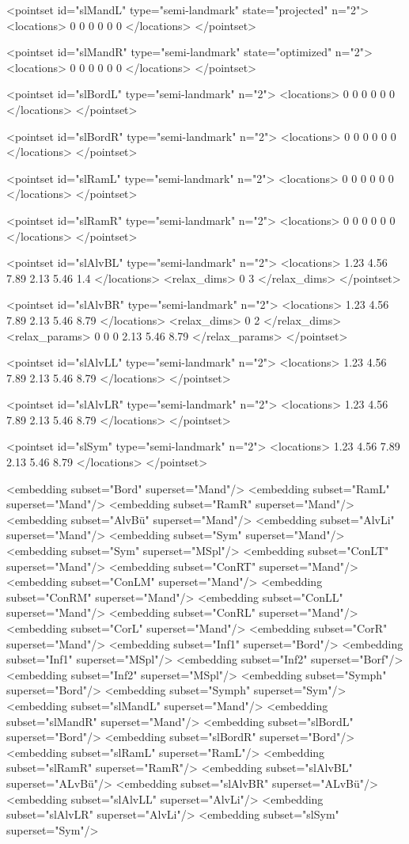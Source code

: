 \begin{DoxyVerbInclude}
<pointset id="slMandL" type="semi-landmark" state="projected" n="2">
<locations>
0 0 0
0 0 0
</locations>
</pointset>

<pointset id="slMandR" type="semi-landmark" state="optimized" n="2">
<locations>
0 0 0
0 0 0
</locations>
</pointset>

<pointset id="slBordL" type="semi-landmark" n="2">
<locations>
0 0 0
0 0 0
</locations>
</pointset>

<pointset id="slBordR" type="semi-landmark" n="2">
<locations>
0 0 0
0 0 0
</locations>
</pointset>

<pointset id="slRamL" type="semi-landmark" n="2">
<locations>
0 0 0
0 0 0
</locations>
</pointset>

<pointset id="slRamR" type="semi-landmark" n="2">
<locations>
0 0 0
0 0 0
</locations>
</pointset>

<pointset id="slAlvBL" type="semi-landmark" n="2">
<locations>
1.23 4.56 7.89
2.13 5.46 1.4
</locations>
<relax_dims>
0
3
</relax_dims>
</pointset>

<pointset id="slAlvBR" type="semi-landmark" n="2">
<locations>
1.23 4.56 7.89
2.13 5.46 8.79
</locations>
<relax_dims>
0
2
</relax_dims>
<relax_params>
0 0 0
2.13 5.46 8.79
</relax_params>
</pointset>

<pointset id="slAlvLL" type="semi-landmark" n="2">
<locations>
1.23 4.56 7.89
2.13 5.46 8.79
</locations>
</pointset>

<pointset id="slAlvLR" type="semi-landmark" n="2">
<locations>
1.23 4.56 7.89
2.13 5.46 8.79
</locations>
</pointset>

<pointset id="slSym" type="semi-landmark" n="2">
<locations>
1.23 4.56 7.89
2.13 5.46 8.79
</locations>
</pointset>

<embedding subset="Bord" superset="Mand"/>
<embedding subset="RamL" superset="Mand"/>
<embedding subset="RamR" superset="Mand"/>
<embedding subset="AlvBü" superset="Mand"/>
<embedding subset="AlvLi" superset="Mand"/>
<embedding subset="Sym" superset="Mand"/>
<embedding subset="Sym" superset="MSpl"/>
<embedding subset="ConLT" superset="Mand"/>
<embedding subset="ConRT" superset="Mand"/>
<embedding subset="ConLM" superset="Mand"/>
<embedding subset="ConRM" superset="Mand"/>
<embedding subset="ConLL" superset="Mand"/>
<embedding subset="ConRL" superset="Mand"/>
<embedding subset="CorL" superset="Mand"/>
<embedding subset="CorR" superset="Mand"/>
<embedding subset="Inf1" superset="Bord"/>
<embedding subset="Inf1" superset="MSpl"/>
<embedding subset="Inf2" superset="Borf"/>
<embedding subset="Inf2" superset="MSpl"/>
<embedding subset="Symph" superset="Bord"/>
<embedding subset="Symph" superset="Sym"/>
<embedding subset="slMandL" superset="Mand"/>
<embedding subset="slMandR" superset="Mand"/>
<embedding subset="slBordL" superset="Bord"/>
<embedding subset="slBordR" superset="Bord"/>
<embedding subset="slRamL" superset="RamL"/>
<embedding subset="slRamR" superset="RamR"/>
<embedding subset="slAlvBL" superset="ALvBü"/>
<embedding subset="slAlvBR" superset="ALvBü"/>
<embedding subset="slAlvLL" superset="AlvLi"/>
<embedding subset="slAlvLR" superset="AlvLi"/>
<embedding subset="slSym" superset="Sym"/>


\end{DoxyVerbInclude}
